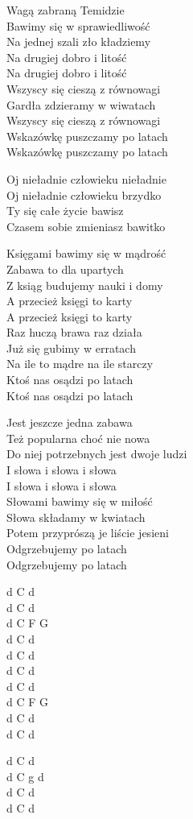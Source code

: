 \begin{text}
    Wagą zabraną Temidzie\\
    Bawimy się w sprawiedliwość\\
    Na jednej szali zło kładziemy\\
    Na drugiej dobro i litość\\
    Na drugiej dobro i litość\\
    Wszyscy się cieszą z równowagi\\
    Gardła zdzieramy w wiwatach\\
    Wszyscy się cieszą z równowagi\\
    Wskazówkę puszczamy po latach\\
    Wskazówkę puszczamy po latach

    Oj nieładnie człowieku nieładnie\\
    Oj nieładnie człowieku brzydko\\
    Ty się całe życie bawisz\\
    Czasem sobie zmieniasz bawitko

    Księgami bawimy się w mądrość\\
    Zabawa to dla upartych\\
    Z ksiąg budujemy nauki i domy\\
    A przecież księgi to karty\\
    A przecież księgi to karty\\
    Raz huczą brawa raz działa\\
    Już się gubimy w erratach\\
    Na ile to mądre na ile starczy\\
    Ktoś nas osądzi po latach\\
    Ktoś nas osądzi po latach

    Jest jeszcze jedna zabawa\\
    Też popularna choć nie nowa\\
    Do niej potrzebnych jest dwoje ludzi\\
    I słowa i słowa i słowa\\
    I słowa i słowa i słowa\\
    Słowami bawimy się w miłość\\
    Słowa składamy w kwiatach\\
    Potem przyprószą je liście jesieni\\
    Odgrzebujemy po latach\\
    Odgrzebujemy po latach
\end{text}
\begin{chord}
    d C d\\
    d C d\\
    d C F G\\
    d C d\\
    d C d\\
    d C d\\
    d C d\\
    d C F G\\
    d C d\\
    d C d

    d C d\\
    d C g d\\
    d C d\\
    d C d
\end{chord}